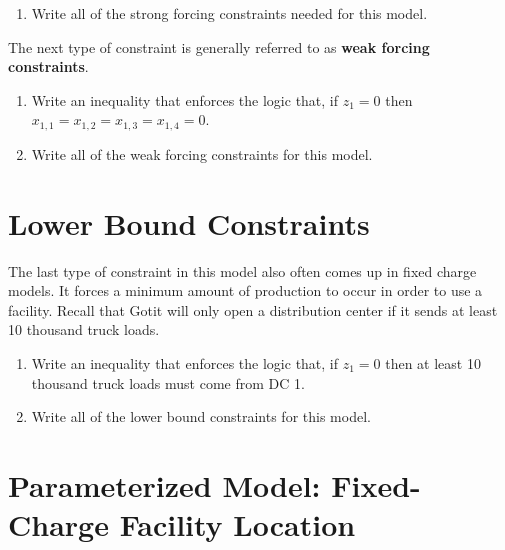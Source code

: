 \documentclass[11pt]{article}
\theoremstyle{definition}
\begin{document}
\begin{enumerate}[resume]
\item Write all of the strong forcing constraints needed for this model. \vfill
\end{enumerate}

\newpage

The next type of constraint is generally referred to as \textbf{weak forcing constraints}.

\begin{enumerate}[resume]
\item Write an inequality that enforces the logic that, if $z_1 = 0$ then $x_{1,1} = x_{1,2} = x_{1,3} = x_{1,4} = 0$. \vspace{2in}
\item Write all of the weak forcing constraints for this model.
\end{enumerate}

\vfill

\section{Lower Bound Constraints}

The last type of constraint in this model also often comes up in fixed charge models. It forces a minimum amount of production to occur in order to use a facility. Recall that Gotit will only open a distribution center if it sends at least 10 thousand truck loads.

\begin{enumerate}[resume]
\item Write an inequality that enforces the logic that, if $z_1 = 0$ then at least 10 thousand truck loads must come from DC 1. \vfill
\item Write all of the lower bound constraints for this model. \vfill
\end{enumerate}



\newpage
\section{Parameterized Model: Fixed-Charge Facility Location}
\end{document}
